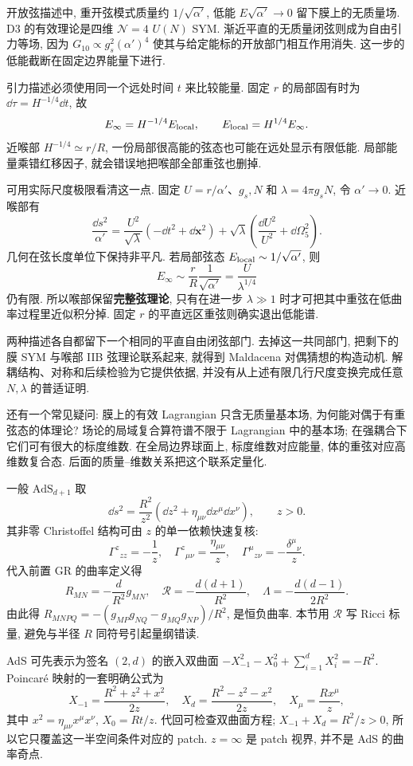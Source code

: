 开放弦描述中, 重开弦模式质量约 $1/\sqrt{\alpha'}$, 低能 $E\sqrt{\alpha'}\to0$ 留下膜上的无质量场. D3 的有效理论是四维 $\mathcal N=4$ $U(N)$ SYM. 渐近平直的无质量闭弦则成为自由引力等场, 因为 $G_{10}\propto g_s^2(\alpha')^4$ 使其与给定能标的开放部门相互作用消失. 这一步的低能截断在固定边界能量下进行.

引力描述必须使用同一个远处时间 $t$ 来比较能量. 固定 $r$ 的局部固有时为 $\dd\tau=H^{-1/4}\dd t$, 故
\[
E_\infty=H^{-1/4}E_{\rm local},\qquad
E_{\rm local}=H^{1/4}E_\infty.
\]
近喉部 $H^{-1/4}\simeq r/R$, 一份局部很高能的弦态也可能在远处显示有限低能. 局部能量乘错红移因子, 就会错误地把喉部全部重弦也删掉.

可用实际尺度极限看清这一点. 固定 $U=r/\alpha'$、$g_s,N$ 和 $\lambda=4\pi g_sN$, 令 $\alpha'\to0$. 近喉部有
\[
\frac{\dd s^2}{\alpha'}=
\frac{U^2}{\sqrt\lambda}(-\dd t^2+\dd\mathbf x^2)
+\sqrt\lambda\left(\frac{\dd U^2}{U^2}+\dd\Omega_5^2\right).
\]
几何在弦长度单位下保持非平凡. 若局部弦态 $E_{\rm local}\sim1/\sqrt{\alpha'}$, 则
\[
E_\infty\sim\frac rR\frac1{\sqrt{\alpha'}}
=\frac{U}{\lambda^{1/4}}
\]
仍有限. 所以喉部保留\textbf{完整弦理论}, 只有在进一步 $\lambda\gg1$ 时才可把其中重弦在低曲率过程里近似积分掉. 固定 $r$ 的平直远区重弦则确实退出低能谱.

两种描述各自都留下一个相同的平直自由闭弦部门. 去掉这一共同部门, 把剩下的膜 SYM 与喉部 IIB 弦理论联系起来, 就得到 Maldacena 对偶猜想的构造动机. 解耦结构、对称和后续检验为它提供依据, 并没有从上述有限几行尺度变换完成任意 $N,\lambda$ 的普适证明.

还有一个常见疑问: 膜上的有效 Lagrangian 只含无质量基本场, 为何能对偶于有重弦态的体理论? 场论的局域复合算符谱不限于 Lagrangian 中的基本场; 在强耦合下它们可有很大的标度维数. 在全局边界球面上, 标度维数对应能量, 体的重弦对应高维数复合态. 后面的质量--维数关系把这个联系定量化.

一般 $\mathrm{AdS}_{d+1}$ 取
\[
\dd s^2=\frac{R^2}{z^2}
(\dd z^2+\eta_{\mu\nu}\dd x^\mu\dd x^\nu),\qquad z>0.
\]
其非零 Christoffel 结构可由 $z$ 的单一依赖快速复核:
\[
\Gamma^z{}_{zz}=-\frac1z,\quad
\Gamma^z{}_{\mu\nu}=\frac{\eta_{\mu\nu}}z,\quad
\Gamma^\mu{}_{z\nu}=-\frac{\delta^\mu{}_{\nu}}z.
\]
代入前置 GR 的曲率定义得
\[
R_{MN}=-\frac d{R^2}g_{MN},\quad
\mathcal R=-\frac{d(d+1)}{R^2},\quad
\Lambda=-\frac{d(d-1)}{2R^2}.
\]
由此得 $R_{MNPQ}=-(g_{MP}g_{NQ}-g_{MQ}g_{NP})/R^2$, 是恒负曲率. 本节用 $\mathcal R$ 写 Ricci 标量, 避免与半径 $R$ 同符号引起量纲错读.

AdS 可先表示为签名 $(2,d)$ 的嵌入双曲面 $-X_{-1}^2-X_0^2+\sum_{i=1}^dX_i^2=-R^2$. Poincaré 映射的一套明确公式为
\[
X_{-1}=\frac{R^2+z^2+x^2}{2z},\quad
X_d=\frac{R^2-z^2-x^2}{2z},\quad
X_\mu=\frac{Rx^\mu}{z},
\]
其中 $x^2=\eta_{\mu\nu}x^\mu x^\nu$, $X_0=Rt/z$. 代回可检查双曲面方程; $X_{-1}+X_d=R^2/z>0$, 所以它只覆盖这一半空间条件对应的 patch. $z=\infty$ 是 patch 视界, 并不是 AdS 的曲率奇点.

